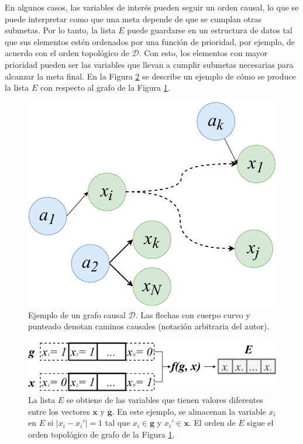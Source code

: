 En algunos casos, las variables de interés pueden seguir un orden causal, lo que se puede interpretar como que una meta depende de que se cumplan otras submetas.
Por lo tanto, la lista $E$ puede guardarse en un estructura de datos tal que sus elementos estén ordenados por una función de prioridad, por ejemplo, de acuerdo con el orden topológico de $\mathcal{D}$. Con esto, los elementos con mayor prioridad pueden ser las variables que llevan a cumplir submetas necesarias para alcanzar la meta final.
En la Figura \ref{fig:e-list} se describe un ejemplo de cómo se produce la lista $E$ con respecto al grafo de la Figura \ref{fig:example-d}. 


\begin{figure}[h]
    \centering
    \includegraphics[scale=0.3]{Chapter4/Figs/examplegraph.pdf}
    \caption{Ejemplo de un grafo causal $\mathcal{D}$. Las flechas con cuerpo curvo y punteado denotan caminos causales (notación arbitraria del autor).}
    \label{fig:example-d}
\end{figure} 


\begin{figure}[h]
    \centering
    \includegraphics[scale=0.45]{Chapter4/Figs/listofinterest.pdf}
    \caption{La lista $E$ se obtiene de las variables que tienen valores diferentes entre los vectores $\mathbf{x}$ y $\mathbf{g}$. En este ejemplo, se almacenan la variable $x_i$ en $E$ si $|x_i - x_i' | = 1$ tal que $x_i\in \mathbf{g}$ y $x_i' \in \mathbf{x}$. El orden de $E$ sigue el orden topológico de grafo de la Figura \ref{fig:example-d}.}
    \label{fig:e-list}
\end{figure} 


